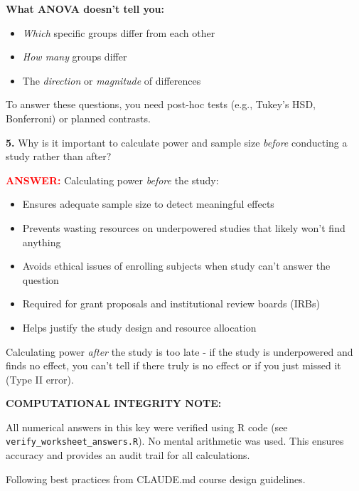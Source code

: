 \documentclass[11pt]{article}
\begin{document}
\textbf{What ANOVA doesn't tell you:}
\begin{itemize}
\item \textit{Which} specific groups differ from each other
\item \textit{How many} groups differ
\item The \textit{direction} or \textit{magnitude} of differences
\end{itemize}

To answer these questions, you need post-hoc tests (e.g., Tukey's HSD, Bonferroni) or planned contrasts.

\vspace{0.5cm}

\textbf{5.} Why is it important to calculate power and sample size \textit{before} conducting a study rather than after?

\textcolor{red}{\textbf{ANSWER:}} Calculating power \textit{before} the study:
\begin{itemize}
\item Ensures adequate sample size to detect meaningful effects
\item Prevents wasting resources on underpowered studies that likely won't find anything
\item Avoids ethical issues of enrolling subjects when study can't answer the question
\item Required for grant proposals and institutional review boards (IRBs)
\item Helps justify the study design and resource allocation
\end{itemize}

Calculating power \textit{after} the study is too late - if the study is underpowered and finds no effect, you can't tell if there truly is no effect or if you just missed it (Type II error).

\vspace{1cm}

\begin{tcolorbox}[colback=yellow!10,colframe=red,boxrule=1pt,arc=0pt]
\textbf{COMPUTATIONAL INTEGRITY NOTE:}

All numerical answers in this key were verified using R code (see \texttt{verify\_worksheet\_answers.R}).
No mental arithmetic was used. This ensures accuracy and provides an audit trail for all calculations.

Following best practices from CLAUDE.md course design guidelines.
\end{tcolorbox}
\end{document}
